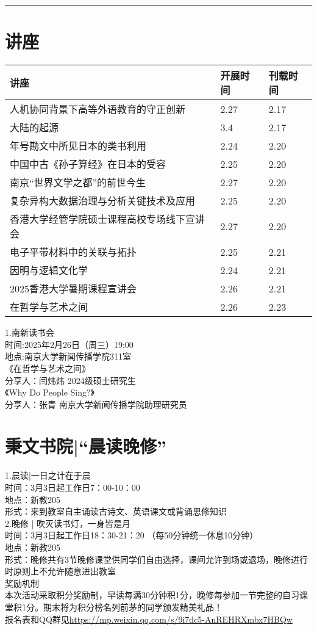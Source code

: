 \documentclass[letterpaper, 12pt]{article}
\begin{document}
\hrule
\pagebreak
\begin{multicols}{2}

\section{讲座}
\begin{tabular}{|>{\centering\arraybackslash}m{}|m{}|m{}|}
    \hline
    讲座 & 开展时间 & 刊载时间\\
    \hline\hline
    人机协同背景下高等外语教育的守正创新 & 2.27 & 2.17\\\hline
    大陆的起源 & 3.4 & 2.17\\\hline
    年号勘文中所见日本的类书利用 & 2.24 & 2.20\\\hline
    中国中古《孙子算经》在日本的受容 & 2.25 & 2.20\\\hline
    南京“世界文学之都”的前世今生 & 2.27 & 2.20\\\hline
    复杂异构大数据治理与分析关键技术及应用 & 2.25 & 2.20\\\hline
    香港大学经管学院硕士课程高校专场线下宣讲会 & 2.27 & 2.20\\\hline
    电子平带材料中的关联与拓扑 & 2.25 & 2.21\\\hline
    因明与逻辑文化学 & 2.24 & 2.21\\\hline
    2025香港大学暑期课程宣讲会 & 2.26 & 2.21\\\hline
    在哲学与艺术之间 & 2.26 & 2.23\\\hline
\end{tabular}
1.南新读书会\\
时间:2025年2月26日（周三）19:00\\
地点:南京大学新闻传播学院311室\\
《在哲学与艺术之间》\\
分享人：闫炜炜 2024级硕士研究生\\
《Why Do People Sing?》\\
分享人：张青 南京大学新闻传播学院助理研究员\\


\section{秉文书院|“晨读晚修”}
1.晨读|一日之计在于晨\\
时间：3月3日起工作日7：00-10：00\\
地点：新教205\\
形式：来到教室自主诵读古诗文、英语课文或背诵思修知识\\
2.晚修 | 吹灭读书灯，一身皆是月\\
时间：3月3日起工作日18：30-21：20 （每50分钟统一休息10分钟）\\
地点：新教205\\
形式：晚修共有3节晚修课堂供同学们自由选择，课间允许到场或退场，晚修进行时原则上不允许随意进出教室\\
奖励机制\\
本次活动采取积分奖励制，早读每满30分钟积1分，晚修每参加一节完整的自习课堂积1分。期末将为积分榜名列前茅的同学颁发精美礼品！\\
报名表和QQ群见\url{https://mp.weixin.qq.com/s/9i7dc5-AnREHRXmbx7HBQw}


\end{multicols}
\end{document}
